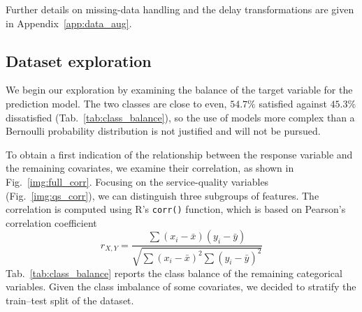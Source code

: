Further details on missing-data handling and the delay transformations are given
in Appendix~\ref{app:data_aug}.

\subsection{Dataset exploration}
\label{sec:data_expl}
We begin our exploration by examining the balance of the target variable for the
prediction model. The two classes are close to even, $54.7\%$ satisfied
against $45.3\%$ dissatisfied (Tab.~\ref{tab:class_balance}), so the use of
models more complex than a Bernoulli probability distribution is not justified
and will not be pursued.

To obtain a first indication of the relationship between the response variable and the remaining covariates, we examine their correlation, as shown in Fig.~\ref{img:full_corr}. Focusing on the service-quality variables (Fig.~\ref{img:qs_corr}), we can distinguish three subgroups of features. The correlation is computed using R's \texttt{corr()} function, which is based on Pearson's correlation coefficient
$$
r_{X,Y} = \frac{\sum (x_i - \bar{x})(y_i - \bar{y})}
               {\sqrt{\sum (x_i - \bar{x})^2 \sum (y_i - \bar{y})^2}}
$$
Tab.~\ref{tab:class_balance} reports the class balance of the remaining categorical variables. Given the class imbalance of some covariates, we decided to stratify the train--test split of the dataset.

